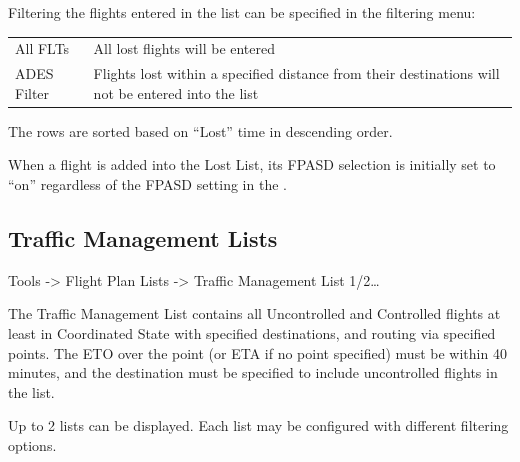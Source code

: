 \documentclass[a4paper,oneside,11pt]{memoir}
\begin{document}
Filtering the flights entered in the list can be specified in the filtering menu:

\begin{longtable}{p{5cm} p{7.5cm}}
  All FLTs    & All lost flights will be entered\\
  ADES Filter & Flights lost within a specified distance from their destinations will not be entered into the list\\
\end{longtable}

\bigskip

The rows are sorted based on “Lost” time in descending order.

\bigskip

When a flight is added into the Lost List, its FPASD selection is initially set to “on” regardless of the FPASD setting in the .

\subsection{Traffic Management Lists}
\label{list:tml}

 Tools -> Flight Plan Lists -> Traffic Management List 1/2…

\bigskip

The Traffic Management List contains all Uncontrolled and Controlled flights at least in Coordinated State with specified destinations, and routing via specified points. The ETO over the point (or ETA if no point specified) must be within 40 minutes, and the destination must be specified to include uncontrolled flights in the list.

\bigskip

Up to 2 lists can be displayed. Each list may be configured with different filtering options.
\end{document}
